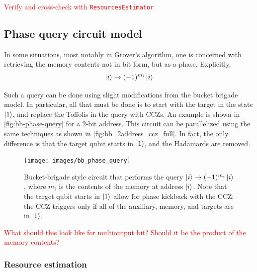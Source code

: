 \documentclass[a4paper,12pt]{article}
\newcommand\todo[1]{\textcolor{red}{#1}}
\begin{document}
\todo{Verify and cross-check with \texttt{ResourcesEstimator}}


\subsection{Phase query circuit model}

In some situations, most notably in Grover's algorithm, one is concerned with retrieving the memory contents not in bit form, but as a phase. 
Explicitly, 
\begin{equation}
 \ket{i} \rightarrow (-1)^{m_i} \ket{i}
\end{equation}

Such a query can be done using slight modifications from the bucket brigade model.
In particular, all that must be done is to start with the target in the state $\ket{1}$, and replace the Toffolis in the query with CCZs.
An example is shown in \autoref{fig:bb-phase-query} for a 2-bit address. 
This circuit can be parallelized using the same techniques as shown in \autoref{fig:bb_2address_ccz_full}.
In fact, the only difference is that the target qubit starts in $\ket{1}$, and the Hadamards are removed.

\begin{figure}[ht!]
 \centering
  \captionsetup{width=.89\linewidth}
 \texttt{[image: images/bb\_phase\_query]}
 \caption{Bucket-brigade style circuit that performs the query $\ket{i} \rightarrow (-1)^{m_i}\ket{i}$, where $m_i$ is  the contents of the memory at address $\ket{i}$.
 Note that the target qubit starts in $\ket{1}$ allow for phase kickback with the CCZ; the CCZ triggers only if all of the auxiliary, memory, and targets are in $\ket{1}$.}
 \label{fig:bb-phase-query}
\end{figure}

\todo{What should this look like for multioutput bit? Should it be the product of the memory contents?}

\subsubsection{Resource estimation}


\end{document}
